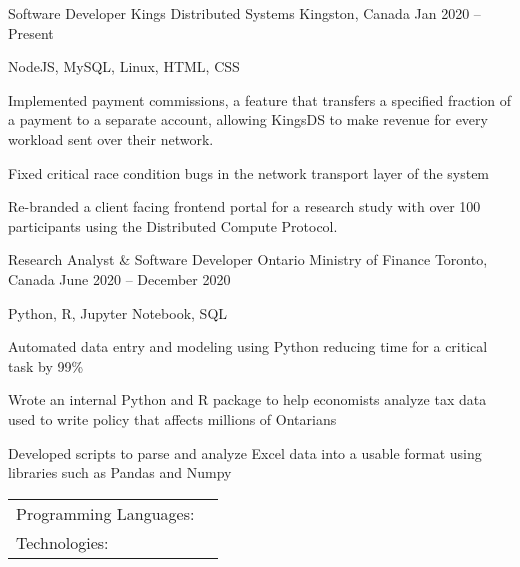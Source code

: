 \documentclass[]{awesome-cv}
\begin{document}
\vspace{-2mm}
\begin{cventries}
	\cventry
	{Software Developer}
	{Kings Distributed Systems}
	{Kingston, Canada}
	{Jan 2020 – Present}
	{\begin{cvitems}
		\item {NodeJS, MySQL, Linux, HTML, CSS}
		\item {Implemented payment commissions, a feature that transfers a specified fraction of a payment to a separate account, allowing KingsDS to make revenue for every workload sent over their network.}
		\item {Fixed critical race condition bugs in the network transport layer of the system}
		\item {Re-branded a client facing frontend portal for a research study with over 100 participants using the Distributed Compute Protocol.}
		\end{cvitems}}
	\cventry
	{Research Analyst \& Software Developer}
	{Ontario Ministry of Finance}
	{Toronto, Canada}
	{June 2020 – December 2020}
	{\begin{cvitems}
		\item {Python, R, Jupyter Notebook, SQL}
		\item {Automated data entry and modeling using Python reducing time for a critical task by 99\%}
		\item {Wrote an internal Python and R package to help economists analyze tax data used to write policy that affects millions of Ontarians}
		\item {Developed scripts to parse and analyze Excel data into a usable format using libraries such as Pandas and Numpy}
		\end{cvitems}}
\end{cventries}
\begin{cventries}
	\cventry
	{}
	{\def\arraystretch{1.15}{\begin{tabular}{ l l }
		Programming Languages:  & {\skill{ JavaScript, C, Python, Kotlin, Java, Shell / Bash, SQL, R, Perl}} \\
		Technologies:  & {\skill{ Node.js, Linux / Unix, Android Studio, Linux Containers, Express.js, Tensorflow}} \\
		\end{tabular}}}
	{}
	{}
	{}
\end{cventries}
\end{document}
